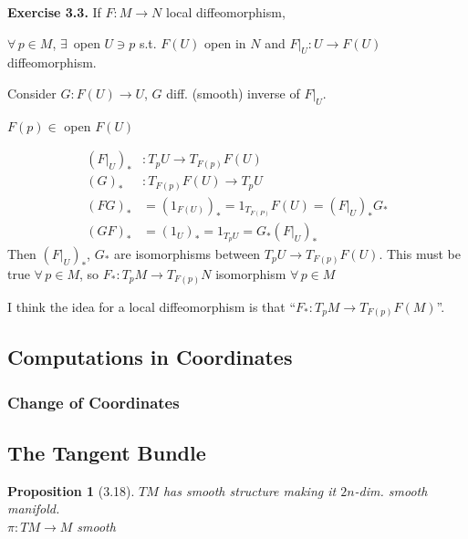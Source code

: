 \documentclass[11pt]{amsart}
\newtheorem{lemma}{Lemma}
\newtheorem{proposition}{Proposition}
\theoremstyle{definition}
\newcommand{\exercisehead}[1]{\medskip\noindent\textbf{Exercise #1.} }
\begin{document}
\exercisehead{3.3} If $F: M \to N$ local diffeomorphism,

$\forall \, p \in M$, $\exists \, $ open $U \ni p$ s.t. $F(U)$ open in $N$ and $\left. F\right|_U : U \to F(U)$ diffeomorphism.

Consider $G: F(U) \to U$, $G$ diff. (smooth) inverse of $\left. F \right|_U$.

$F(p) \in $ open $F(U)$

\[
\begin{aligned}
  ( \left. F \right|_U )_*    &    : T_pU \to T_{ F(p)}F(U) \\
  (G)_*                       &    : T_{F(p)}F(U) \to T_pU \\
  (FG)_*                      & = (1_{F(U)} )_* = 1_{T_{F(P)}}F(U) = ( \left. F \right|_U )_* G_* \\
  (GF)_*    & = (1_U)_* = 1_{T_pU} = G_* (  \left. F \right|_U)_*
\end{aligned}
\]
Then $( \left. F \right|_U)_*$, $G_*$ are isomorphisms between $T_pU \to T_{F(p)}F(U)$.  This must be true $\forall \, p \in M$, so $F_* : T_pM \to T_{F(p)}N$ isomorphism $\forall \, p \in M$

I think the idea for a local diffeomorphism is that ``$F_* : T_p M \to T_{F(p)}F(M)$''.



\subsection*{Computations in Coordinates}

\subsubsection*{Change of Coordinates}







\subsection*{The Tangent Bundle }


\begin{proposition}[3.18] $TM$ has smooth structure making it $2n$-dim. smooth manifold.  \\
$\pi :TM \to M$ smooth \end{proposition}
\end{document}

